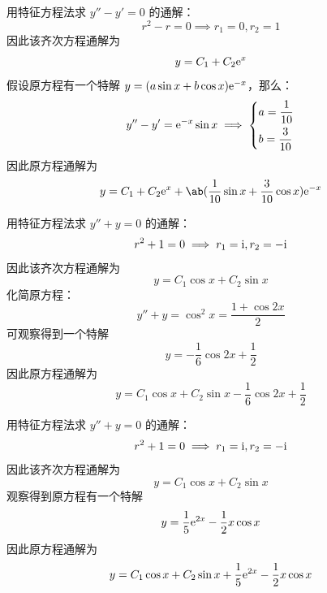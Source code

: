 \begin{problem}
\begin{solution}
        \item[\textbf{5)}] 用特征方程法求 $y'' - y' = 0$ 的通解：
        $$
        r^2 - r = 0 \implies r_1 = 0, r_2 = 1
        $$
        因此该齐次方程通解为
        $$
        y = C_1 + C_2 \mathrm{e}^{x}
        $$
        假设原方程有一个特解 $y = (a \sin x + b \cos x) \mathrm{e}^{-x}$，那么：
        $$
        y'' - y' = \mathrm{e}^{-x} \sin x \implies \begin{dcases}
            a = \frac{1}{10} \\
            b = \frac{3}{10}
        \end{dcases}
        $$
        因此原方程通解为
        $$
        y = C_1 + C_2 \E^{x} + \ab(\frac{1}{10} \sin x + \frac{3}{10} \cos x) \E^{-x}
        $$

        \item[\textbf{6)}] 用特征方程法求 $y'' + y = 0$ 的通解：
        $$
        r^2 + 1 = 0 \implies r_1 = \mathrm{i}, r_2 = -\mathrm{i}
        $$
        因此该齐次方程通解为
        $$
        y = C_1 \cos x + C_2 \sin x
        $$
        化简原方程：
        $$
        y'' + y = \cos^2 x = \frac{1 + \cos 2x}{2}
        $$
        可观察得到一个特解
        $$
        y = -\frac{1}{6} \cos 2x + \frac{1}{2}
        $$
        因此原方程通解为
        $$
        y = C_1 \cos x + C_2 \sin x - \frac{1}{6} \cos 2x + \frac{1}{2}
        $$

        \item[\textbf{7)}] 用特征方程法求 $y'' + y = 0$ 的通解：
        $$
        r^2 + 1 = 0 \implies r_1 = \mathrm{i}, r_2 = -\mathrm{i}
        $$
        因此该齐次方程通解为
        $$
        y = C_1 \cos x + C_2 \sin x
        $$
        观察得到原方程有一个特解
        $$
        y = \frac{1}{5} \mathrm{e}^{2x} - \frac{1}{2} x \cos x
        $$
        因此原方程通解为
        $$
        y = C_1 \cos x + C_2 \sin x + \frac{1}{5} \mathrm{e}^{2x} - \frac{1}{2} x \cos x
        $$
    \end{solution}
\end{problem}